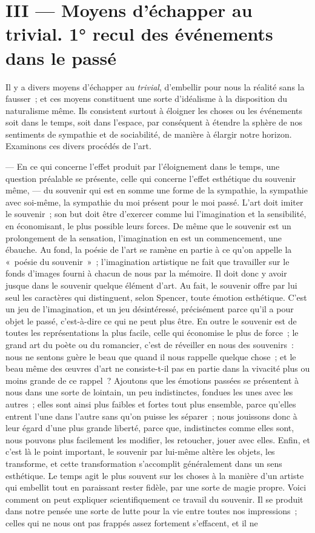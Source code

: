\documentclass[french,twoside]{book} %
\begin{document}
\section[{III — Moyens d’échapper au trivial. 1° recul des événements dans le passé}]{III — Moyens d’échapper au trivial. 1° recul des événements dans le passé}
\noindent Il y a divers moyens d’échapper au \emph{trivial}, d’embellir pour nous la réalité sans la fausser ; et ces moyens constituent une sorte d’idéalisme à la disposition du naturalisme même. Ils consistent surtout à éloigner les choses ou les événements soit dans le temps, soit dans l’espace, par conséquent à étendre la sphère de nos sentiments de sympathie et de sociabilité, de manière à élargir notre horizon. Examinons ces divers procédés de l’art.\par
— En ce qui concerne l’effet produit par l’éloignement dans le temps, une question préalable se présente, celle qui concerne l’effet esthétique du souvenir même, — du souvenir qui est en somme une forme de la sympathie, la sympathie avec soi-même, la sympathie du moi présent pour le moi passé. L’art doit imiter le souvenir ; son but doit être d’exercer comme lui l’imagination et la sensibilité, en économisant, le plus possible leurs forces. De même que le souvenir est un prolongement de la sensation, l’imagination en est un commencement, une ébauche. Au fond, la poésie de l’art se ramène en partie à ce qu’on appelle la « poésie du souvenir » ; l’imagination artistique ne fait que travailler sur le fonds d’images fourni à chacun de nous par la mémoire. Il doit donc y avoir jusque dans le souvenir quelque élément d’art. Au fait, le souvenir offre par lui seul les caractères qui distinguent, selon Spencer, toute émotion esthétique. C’est un jeu de l’imagination, et un jeu désintéressé, précisément parce qu’il a pour objet le passé, c’est-à-dire ce qui ne peut plus être. En outre le souvenir est de toutes les représentations la plus facile, celle qui économise le plus de force ; le grand art du poète ou du romancier, c’est de réveiller en nous des souvenirs : nous ne sentons guère le beau que quand il nous rappelle quelque chose ; et le beau même des œuvres d’art ne consiste-t-il pas en partie dans la vivacité plus ou moins grande de ce rappel ? Ajoutons que les émotions passées se présentent à nous dans une sorte de lointain, un peu indistinctes, fondues les unes avec les autres ; elles sont ainsi plus faibles et fortes tout plus ensemble, parce qu’elles entrent l’une dans l’autre sans qu’on puisse les séparer ; nous jouissons donc à leur égard d’une plus grande liberté, parce que, indistinctes comme elles sont, nous pouvons plus facilement les modifier, les retoucher, jouer avec elles. Enfin, et c’est là le point important, le souvenir par lui-même altère les objets, les transforme, et cette transformation s’accomplit généralement dans un sens esthétique. Le temps agit le plus souvent sur les choses à la manière d’un artiste qui embellit tout en paraissant rester fidèle, par une sorte de magie propre. Voici comment on peut expliquer scientifiquement ce travail du souvenir. Il se produit dans notre pensée une sorte de lutte pour la vie entre toutes nos impressions ; celles qui ne nous ont pas frappés assez fortement s’effacent, et il ne 
\end{document}
